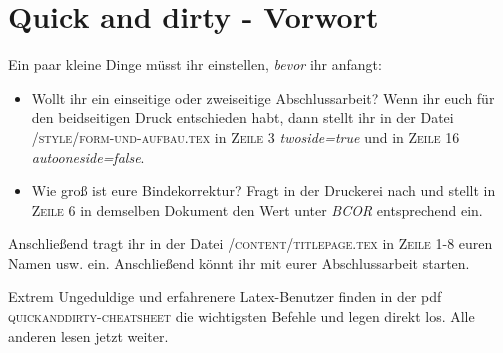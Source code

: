 \chapter{Quick and dirty - Vorwort}%
\label{chap: vorwort}%
Ein paar kleine Dinge müsst ihr einstellen, \emph{bevor} ihr anfangt:%
\begin{itemize}%
\item Wollt ihr ein einseitige oder zweiseitige Abschlussarbeit? Wenn ihr euch für den beidseitigen Druck entschieden habt, dann stellt ihr in der Datei \textsc{/style/form-und-aufbau.tex} in \textsc{Zeile 3} \emph{twoside=true} und in \textsc{Zeile 16} \emph{autooneside=false}.%
\item Wie groß ist eure Bindekorrektur? Fragt in der Druckerei nach und stellt in \textsc{Zeile 6} in demselben Dokument den Wert unter \emph{BCOR} entsprechend ein.%
\end{itemize}%
Anschließend tragt ihr in der Datei \textsc{/content/titlepage.tex} in \textsc{Zeile 1-8} euren Namen usw. ein. Anschließend könnt ihr mit eurer Abschlussarbeit starten.%

Extrem Ungeduldige und erfahrenere Latex-Benutzer finden in der pdf \textsc{quickanddirty-cheatsheet} die wichtigsten Befehle und legen direkt los. Alle anderen lesen jetzt weiter.\\%